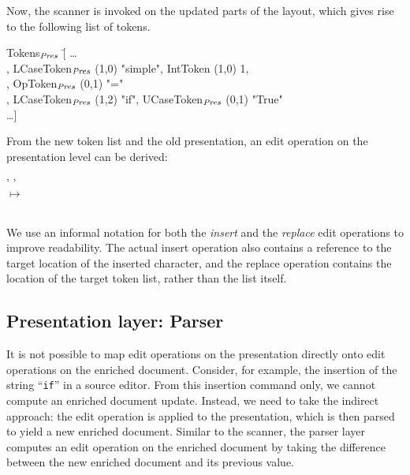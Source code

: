 \documentclass{speauth}
\begin{document}
Now, the scanner is invoked on the updated parts of the layout, which gives rise to the following list of tokens.

\small \ttfamily
\begin{tabbing}
Tokens$_{\mathit{Pres}}$ \= [ \dots \\
                           \> , LCaseToken$_{\mathit{Pres}}$ (1,0) "simple", IntToken (1,0) 1,\\
                           \> , OpToken$_{\mathit{Pres}}$ (0,1) "="\\
                           \> , LCaseToken$_{\mathit{Pres}}$ (1,2) "if", UCaseToken$_{\mathit{Pres}}$ (0,1) "True"\\
                           \> \dots ]                      
\end{tabbing}
\rmfamily \normalsize
 
From the new token list and the old presentation, an edit operation on the presentation level can be derived:

\small \ttfamily
\begin{tabbing}
 \ttfamily ' ' \\
$\mapsto$\\
 \\  
  
\end{tabbing}
\rmfamily \normalsize

We use an informal notation for both the {\em insert} and the {\em replace} edit operations to improve readability. The actual insert operation also contains a reference to the target location of the inserted character, and the replace operation contains the location of the target token list, rather than the list itself. 


%																
\subsection{Presentation layer: Parser} \label{sect:parser}
        

It is not possible to map edit operations on the presentation directly onto edit operations on the enriched document. Consider, for example, the insertion of the string ``\verb|if|'' in a source editor. From this insertion command only, we cannot compute an enriched document update. Instead, we need to take the indirect approach: the edit operation is applied to the presentation, which is then parsed to yield a new enriched document. Similar to the scanner, the parser layer computes an edit operation on the enriched document by taking the difference between the new enriched document and its previous value. 
\end{document}
